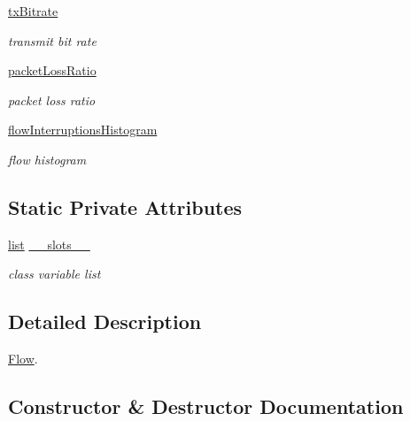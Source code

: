 \begin{DoxyCompactItemize}
\hyperlink{classflowmon-parse-results_1_1Flow_a20b8d5d879b4fbd24d590a7f18510016}{tx\+Bitrate}
\begin{DoxyCompactList}\small\item\em transmit bit rate \end{DoxyCompactList}\item 
\hyperlink{classflowmon-parse-results_1_1Flow_a644d64afcdc8e8ce9043c416c1257653}{packet\+Loss\+Ratio}
\begin{DoxyCompactList}\small\item\em packet loss ratio \end{DoxyCompactList}\item 
\hyperlink{classflowmon-parse-results_1_1Flow_a05885d2c1e5809c906e40d253034ebe5}{flow\+Interruptions\+Histogram}
\begin{DoxyCompactList}\small\item\em flow histogram \end{DoxyCompactList}\end{DoxyCompactItemize}
\subsection*{Static Private Attributes}
\begin{DoxyCompactItemize}
\item 
\hyperlink{openflow-interface_8h_afd9bcfa176617760671b67580f536fa7}{list} \hyperlink{classflowmon-parse-results_1_1Flow_adc84d2a98a3dfd7addbbb7e7b4d67a8d}{\+\_\+\+\_\+slots\+\_\+\+\_\+}
\begin{DoxyCompactList}\small\item\em class variable list \end{DoxyCompactList}\end{DoxyCompactItemize}


\subsection{Detailed Description}
\hyperlink{classflowmon-parse-results_1_1Flow}{Flow}. 

\subsection{Constructor \& Destructor Documentation}
